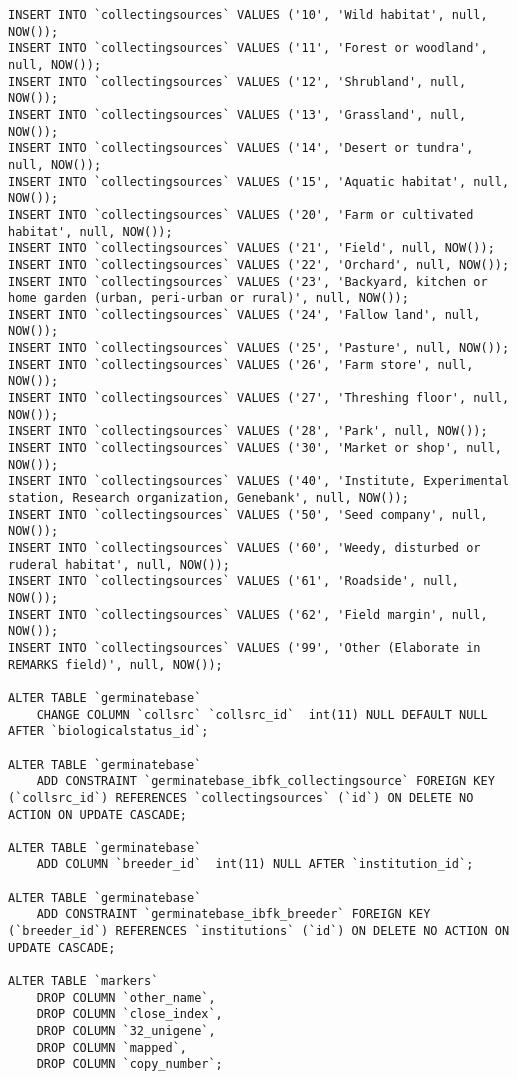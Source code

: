 \begin{itemize}
\begin{lstlisting}[style=SQL]
INSERT INTO `collectingsources` VALUES ('10', 'Wild habitat', null, NOW());
INSERT INTO `collectingsources` VALUES ('11', 'Forest or woodland', null, NOW());
INSERT INTO `collectingsources` VALUES ('12', 'Shrubland', null, NOW());
INSERT INTO `collectingsources` VALUES ('13', 'Grassland', null, NOW());
INSERT INTO `collectingsources` VALUES ('14', 'Desert or tundra', null, NOW());
INSERT INTO `collectingsources` VALUES ('15', 'Aquatic habitat', null, NOW());
INSERT INTO `collectingsources` VALUES ('20', 'Farm or cultivated habitat', null, NOW());
INSERT INTO `collectingsources` VALUES ('21', 'Field', null, NOW());
INSERT INTO `collectingsources` VALUES ('22', 'Orchard', null, NOW());
INSERT INTO `collectingsources` VALUES ('23', 'Backyard, kitchen or home garden (urban, peri-urban or rural)', null, NOW());
INSERT INTO `collectingsources` VALUES ('24', 'Fallow land', null, NOW());
INSERT INTO `collectingsources` VALUES ('25', 'Pasture', null, NOW());
INSERT INTO `collectingsources` VALUES ('26', 'Farm store', null, NOW());
INSERT INTO `collectingsources` VALUES ('27', 'Threshing floor', null, NOW());
INSERT INTO `collectingsources` VALUES ('28', 'Park', null, NOW());
INSERT INTO `collectingsources` VALUES ('30', 'Market or shop', null, NOW());
INSERT INTO `collectingsources` VALUES ('40', 'Institute, Experimental station, Research organization, Genebank', null, NOW());
INSERT INTO `collectingsources` VALUES ('50', 'Seed company', null, NOW());
INSERT INTO `collectingsources` VALUES ('60', 'Weedy, disturbed or ruderal habitat', null, NOW());
INSERT INTO `collectingsources` VALUES ('61', 'Roadside', null, NOW());
INSERT INTO `collectingsources` VALUES ('62', 'Field margin', null, NOW());
INSERT INTO `collectingsources` VALUES ('99', 'Other (Elaborate in REMARKS field)', null, NOW());

ALTER TABLE `germinatebase`
	CHANGE COLUMN `collsrc` `collsrc_id`  int(11) NULL DEFAULT NULL AFTER `biologicalstatus_id`;

ALTER TABLE `germinatebase`
	ADD CONSTRAINT `germinatebase_ibfk_collectingsource` FOREIGN KEY (`collsrc_id`) REFERENCES `collectingsources` (`id`) ON DELETE NO ACTION ON UPDATE CASCADE;

ALTER TABLE `germinatebase`
	ADD COLUMN `breeder_id`  int(11) NULL AFTER `institution_id`;

ALTER TABLE `germinatebase`
	ADD CONSTRAINT `germinatebase_ibfk_breeder` FOREIGN KEY (`breeder_id`) REFERENCES `institutions` (`id`) ON DELETE NO ACTION ON UPDATE CASCADE;

ALTER TABLE `markers`
	DROP COLUMN `other_name`,
	DROP COLUMN `close_index`,
	DROP COLUMN `32_unigene`,
	DROP COLUMN `mapped`,
	DROP COLUMN `copy_number`;


\end{lstlisting}
\end{itemize}
